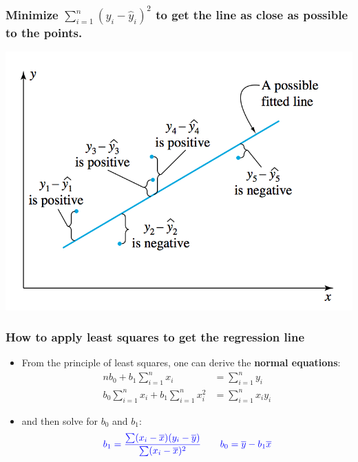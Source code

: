 \documentclass[handout]{beamer}\usepackage[]{graphicx}\usepackage[]{color}
\providecommand{\ov}[1]{\overline{#1}}
\providecommand{\wh}[1]{\widehat{#1}}
\numberwithin{equation}{section}
\begin{document}
\begin{frame}
\frametitle{\small Minimize $\sum_{i = 1}^n (y_i - \wh{y}_i)^2$ to get the line as close as possible to the points.}
 \includegraphics{../../fig/lossfunplot.png}
\end{frame}


\begin{frame}
\frametitle{How to apply least squares to get the regression line}
\begin{itemize}
\item From the principle of least squares, one can derive the {\bf normal equations}:
\pause \begin{align*}
n b_0 + b_1 \sum_{i = 1}^n x_i &= \sum_{i = 1}^n y_i \\
b_0 \sum_{i = 1}^n x_i + b_1 \sum_{i = 1}^n x_i^2 &= \sum_{i = 1}^n x_i y_i 
\end{align*}
\pause \item and then solve for $b_0$ and $b_1$:
\pause \begin{align*}
\color{blue} b_1 = \frac{\sum(x_i - \ov{x})(y_i - \ov{y})}{\sum(x_i - \ov{x})^2} \qquad b_0 = \ov{y}- b_1 \ov{x}
\end{align*}
\end{itemize}
\end{frame}
\end{document}
